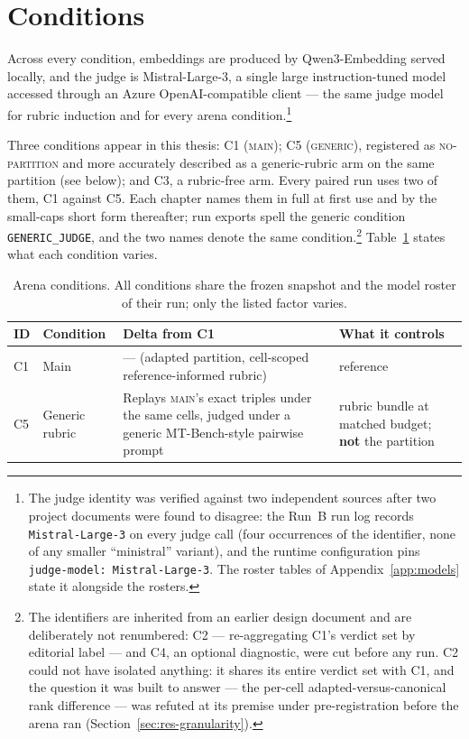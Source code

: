 \section{Conditions}\label{sec:exp-arena-conditions}

Across every condition, embeddings are produced by Qwen3-Embedding
served locally, and the judge is Mistral-Large-3, a single large
instruction-tuned model accessed through an Azure OpenAI-compatible
client --- the same judge model for rubric induction and for every
arena condition.\footnote{The judge identity
was verified against two independent sources after two project
documents were found to disagree: the Run~B run log records
\texttt{Mistral-Large-3} on every judge call (four occurrences of the
identifier, none of any smaller ``ministral'' variant), and the runtime
configuration pins \texttt{judge-model: \textquotedbl{}Mistral-Large-3\textquotedbl{}}. The roster
tables of Appendix~\ref{app:models} state it alongside the rosters.}

Three conditions appear in this thesis: C1 (\textsc{main}); C5
(\textsc{generic}), registered as \textsc{no-partition} and more
accurately described as a generic-rubric arm on the same partition
(see below); and C3, a rubric-free arm. Every paired run uses two of
them, C1 against C5. Each chapter names them in full at first use
and by the small-caps short form thereafter; run exports spell the
generic condition \texttt{GENERIC\_JUDGE}, and the two names denote
the same condition.\footnote{The identifiers are inherited from an
earlier design document and are deliberately not renumbered: C2 ---
re-aggregating C1's verdict set by editorial label --- and C4, an
optional diagnostic, were cut before any run. C2 could not have
isolated anything: it shares its entire verdict set with C1, and the
question it was built to answer --- the per-cell
adapted-versus-canonical rank difference --- was refuted at its
premise under pre-registration before the arena ran
(Section~\ref{sec:res-granularity}).}
Table~\ref{tab:arena-conditions} states what each condition varies.

\begin{table}[htbp]
    \centering
    \caption{Arena conditions. All conditions share the frozen
    snapshot and the model roster of their run; only the listed factor
    varies.}
    \label{tab:arena-conditions}
    \begin{tabular}{p{0.9cm}p{2.7cm}p{4.4cm}p{4.0cm}}
        \toprule
        ID & Condition & Delta from C1 & What it controls \\
        \midrule
        C1 & Main
        & --- (adapted partition, cell-scoped reference-informed rubric)
        & reference \\
        \addlinespace
        C5 & Generic rubric
        & Replays \textsc{main}'s exact triples under the same cells,
        judged under a generic MT-Bench-style pairwise prompt
        & rubric bundle at matched budget; \textbf{not} the partition \\
        \bottomrule
    \end{tabular}
\end{table}

